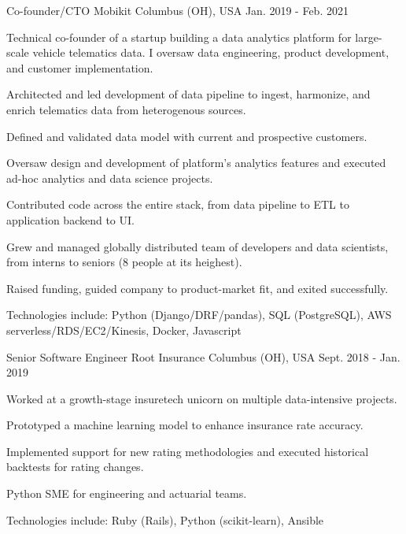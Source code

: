 \begin{cventries}
  \cventry
    {Co-founder/CTO} %
    {Mobikit} %
    {Columbus (OH), USA} %
    {Jan. 2019 - Feb. 2021} %
    {
      Technical co-founder of a startup building a data analytics platform for large-scale vehicle telematics data. I oversaw data engineering, product development, and customer implementation.
      \vspace{5.0mm}
      \begin{cvitems} %
        \item {Architected and led development of data pipeline to ingest, harmonize, and enrich telematics data from heterogenous sources.}
        \item {Defined and validated data model with current and prospective customers.}
        \item {Oversaw design and development of platform's analytics features and executed ad-hoc analytics and data science projects.}
        \item {Contributed code across the entire stack, from data pipeline to ETL to application backend to UI.}
        \item {Grew and managed globally distributed team of developers and data scientists, from interns to seniors (8 people at its heighest).}
        \item {Raised funding, guided company to product-market fit, and exited successfully.}
        \item {Technologies include: Python (Django/DRF/pandas), SQL (PostgreSQL), AWS serverless/RDS/EC2/Kinesis, Docker, Javascript}
      \end{cvitems}
    }

  \cventry
    {Senior Software Engineer} %
    {Root Insurance} %
    {Columbus (OH), USA} %
    {Sept. 2018 - Jan. 2019} %
    {
      Worked at a growth-stage insuretech unicorn on multiple data-intensive projects.
      \vspace{5.0mm}
      \begin{cvitems} %
        \item {Prototyped a machine learning model to enhance insurance rate accuracy.}
        \item {Implemented support for new rating methodologies and executed historical backtests for rating changes.}
        \item {Python SME for engineering and actuarial teams.}
        \item {Technologies include: Ruby (Rails), Python (scikit-learn), Ansible}
      \end{cvitems}
    }


\end{cventries}
